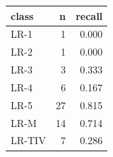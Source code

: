 \begin{tabular}{lrr}
\toprule
class & n & recall \\
\midrule
LR-1 & 1 & 0.000 \\
LR-2 & 1 & 0.000 \\
LR-3 & 3 & 0.333 \\
LR-4 & 6 & 0.167 \\
LR-5 & 27 & 0.815 \\
LR-M & 14 & 0.714 \\
LR-TIV & 7 & 0.286 \\
\bottomrule
\end{tabular}
